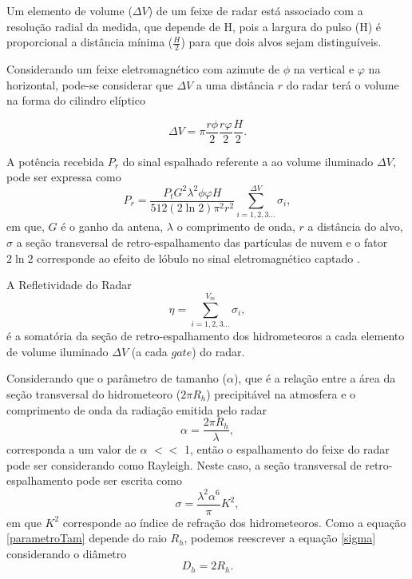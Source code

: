 Um elemento de volume ($\Delta V$) de um feixe de radar está associado com a resolução radial da medida, que depende de H, pois a largura do pulso (H) é proporcional a distância mínima ($\frac{H}{2}$) para que dois alvos sejam distinguíveis.
 
Considerando um feixe eletromagnético com azimute de $\phi$ na vertical e $\varphi$ na horizontal, pode-se considerar que $\Delta V$ a uma distância $r$ do radar terá o volume na forma do cilindro elíptico

\begin{equation}
\Delta V = \pi \dfrac{r\phi}{2} \dfrac{r\varphi}{2} \dfrac{H}{2} .
\end{equation}
 
A potência recebida $P_r$ do sinal espalhado referente a ao volume iluminado $\Delta V$, pode ser expressa como
\begin{equation}
P_r = \dfrac{P_t G^2 \lambda^2 \phi \varphi H}{ 512 (2\ln2)\pi^2 r^2} \sum_{i=1, 2, 3 ... }^{\Delta V} \sigma_i ,
\label{radar1}
\end{equation}
em que, $G$ é o ganho da antena, $\lambda$ o comprimento de onda, $r$ a distância do alvo, $\sigma$ a seção transversal de retro-espalhamento das partículas de nuvem e o fator $2\ln2$ corresponde ao efeito de lóbulo no sinal eletromagnético captado \cite{battan1973}.

A Refletividade do Radar 
\begin{equation}
\eta = \sum_{i=1, 2, 3 ... }^{V_{m}} \sigma_i,
\label{refletividade}
\end{equation}
é a somatória da seção de retro-espalhamento dos hidrometeoros a cada elemento de volume iluminado $\Delta V$ (a cada $gate$) do radar.

Considerando que o parâmetro de tamanho ($\alpha$), que é a relação entre a área da seção transversal do hidrometeoro ($2\pi R_{h}$) precipitável na atmosfera e o comprimento de onda da radiação emitida pelo radar
\begin{equation}
\alpha = \dfrac{2\pi R_{h} }{\lambda},
\label{parametroTam} 
\end{equation}
corresponda a um valor de $\alpha$ $<<$ 1, então o espalhamento do feixe do radar pode ser considerando como Rayleigh. Neste caso, a seção transversal de retro-espalhamento pode ser escrita como 
\begin{equation}
\sigma = \dfrac{\lambda^2 \alpha^6}{\pi} K^2,
\label{sigma}
\end{equation}
em que $K^2$ corresponde ao índice de refração dos hidrometeoros. Como a equação \ref{parametroTam} depende do raio $R_h$, podemos reescrever a equação \ref{sigma} considerando o diâmetro 
\begin{equation}
D_h = 2R_h.
\label{diametro}
\end{equation}

